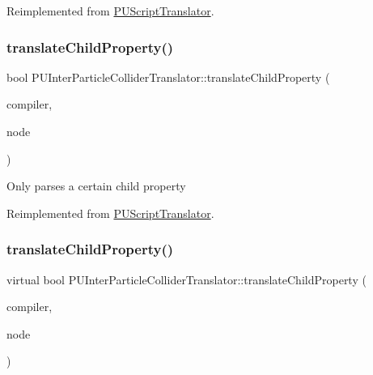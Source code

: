 Reimplemented from \hyperlink{classPUScriptTranslator_ab587d01348ae3e678cb700c719b2b113}{P\+U\+Script\+Translator}.

\mbox{\label{classPUInterParticleColliderTranslator_a486eb93bee4ac3e7c0a8fc37d0113483}} 
\subsubsection{\texorpdfstring{translate\+Child\+Property()}{translateChildProperty()}\hspace{0.1cm}{\footnotesize\ttfamily [1/2]}}
{\footnotesize\ttfamily bool P\+U\+Inter\+Particle\+Collider\+Translator\+::translate\+Child\+Property (\begin{DoxyParamCaption}\item[{\hyperlink{classPUScriptCompiler}{P\+U\+Script\+Compiler} $\ast$}]{compiler,  }\item[{\hyperlink{classPUAbstractNode}{P\+U\+Abstract\+Node} $\ast$}]{node }\end{DoxyParamCaption})\hspace{0.3cm}{\ttfamily [virtual]}}

Only parses a certain child property 

Reimplemented from \hyperlink{classPUScriptTranslator_a0374d83a8a04e57918975d525e0f8fe8}{P\+U\+Script\+Translator}.

\mbox{\label{classPUInterParticleColliderTranslator_a0143ebbe571b2a6d48898bf4c0c8e354}} 
\subsubsection{\texorpdfstring{translate\+Child\+Property()}{translateChildProperty()}\hspace{0.1cm}{\footnotesize\ttfamily [2/2]}}
{\footnotesize\ttfamily virtual bool P\+U\+Inter\+Particle\+Collider\+Translator\+::translate\+Child\+Property (\begin{DoxyParamCaption}\item[{\hyperlink{classPUScriptCompiler}{P\+U\+Script\+Compiler} $\ast$}]{compiler,  }\item[{\hyperlink{classPUAbstractNode}{P\+U\+Abstract\+Node} $\ast$}]{node }\end{DoxyParamCaption})\hspace{0.3cm}{\ttfamily [virtual]}}

